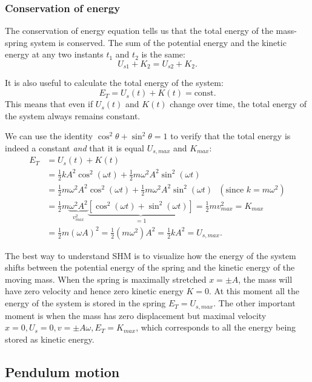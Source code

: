 \documentclass[letterpaper,9pt,journal]{IEEEtran}
\newcommand{\dokuitalic}[1]{\textsl{#1}}
\begin{document}
\subsubsection{Conservation of energy}

The conservation of energy equation tells us that the total energy of the mass-spring system is conserved.
The sum of the potential energy and the kinetic energy at any two instants $t_1$ and $t_2$ is the same:
\[
 U_{s1} + K_2 = U_{s2} + K_2.
\]

It is also useful to calculate the total energy of the system:
\[
 E_T = U_s(t) + K(t) = \text{const}.
\]
This means that even if $U_s(t)$ and $K(t)$ change over time,
the total energy of the system always remains constant.

We can use the identity $\cos^2\theta + \sin^2\theta =1$ to verify that 
the total energy is indeed a constant \dokuitalic{and} that it is equal $U_{s,max}$ and $K_{max}$:
\begin{align*}
 E_{T}
 &= U_s(t) + K(t) \\
 &= \frac{1}{2}kA^2\cos^2(\omega t) + \frac {1}{2}m\omega^2A^2\sin^2(\omega t) \\
 &= \frac{1}{2}m\omega^2A^2\cos^2(\omega t ) + \frac {1}{2}m\omega^2A^2\sin^2(\omega t ) \ \ \ (\text{since } k  = m\omega^2 )\\
 &= \frac{1}{2}m\underbrace{\omega^2A^2}_{v_{max}^2}\underbrace{\left[ \cos^2(\omega t) + \sin^2(\omega t)\right]}_{=1} = \frac{1}{2}mv_{max}^2 = K_{max} \\
 & =\frac{1}{2}m(\omega A)^2 = \frac{1}{2}(m \omega^2) A^2 =\frac{1}{2}kA^2 = U_{s,max}.
\end{align*}

The best way to understand SHM is to visualize how the energy of the system shifts between the 
potential energy of the spring and the kinetic energy of the moving mass.
When the spring is maximally stretched $x=\pm A$, 
the mass will have zero velocity and hence zero kinetic energy $K=0$. 
At this moment all the energy of the system is stored in the spring  $E_T= U_{s,max}$.
The other important moment is when the mass has zero displacement but maximal velocity $x=0, U_s=0, v=\pm A\omega, E_T=K_{max}$,
which corresponds to all the energy being stored as kinetic energy.

\vspace{-3mm}
\subsection{Pendulum motion}
\label{8c0668f76ddfe02953e8e4864c93ce3e}%
\end{document}
